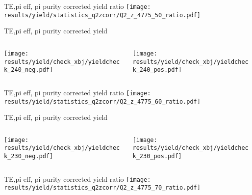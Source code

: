 \begin{frame}{TE,pi eff, pi purity corrected yield ratio}
\texttt{[image: results/yield/statistics\_q2zcorr/Q2\_z\_4775\_50\_ratio.pdf]}
\end{frame}
\begin{frame}{TE,pi eff, pi purity corrected yield}
\begin{columns}
\begin{column}[T]{0.5\textwidth}
\texttt{[image: results/yield/check\_xbj/yieldcheck\_240\_neg.pdf]}
\end{column}
\begin{column}[T]{0.5\textwidth}
\texttt{[image: results/yield/check\_xbj/yieldcheck\_240\_pos.pdf]}
\end{column}
\end{columns}
\end{frame}
\begin{frame}{TE,pi eff, pi purity corrected yield ratio}
\texttt{[image: results/yield/statistics\_q2zcorr/Q2\_z\_4775\_60\_ratio.pdf]}
\end{frame}
\begin{frame}{TE,pi eff, pi purity corrected yield}
\begin{columns}
\begin{column}[T]{0.5\textwidth}
\texttt{[image: results/yield/check\_xbj/yieldcheck\_230\_neg.pdf]}
\end{column}
\begin{column}[T]{0.5\textwidth}
\texttt{[image: results/yield/check\_xbj/yieldcheck\_230\_pos.pdf]}
\end{column}
\end{columns}
\end{frame}
\begin{frame}{TE,pi eff, pi purity corrected yield ratio}
\texttt{[image: results/yield/statistics\_q2zcorr/Q2\_z\_4775\_70\_ratio.pdf]}
\end{frame}
